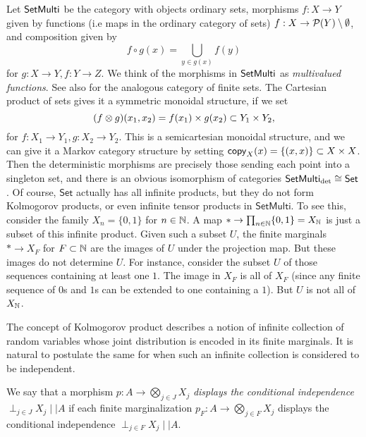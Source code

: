 \documentclass[11pt]{article}
\renewcommand{\sf}{\mathsf}
\begin{document}
\begin{example}
    \label{setmulti}
    Let $\operatorname{\mathsf{SetMulti}}$ be the category with objects ordinary sets, morphisms $f: X \to Y$ given by functions (i.e maps in the ordinary category of sets) $f: X \to \mathcal{P}(Y)\setminus \emptyset$, and composition given by
    \[f\circ g(x) = \bigcup_{y \in g(x)} f(y)\]
    for $g: X \to Y, f: Y \to Z$.
    We think of the morphisms in $\operatorname{\mathsf{SetMulti}}$ as \emph{multivalued functions}.
    See also \cite[Example~2.6]{markov_cats} for the analogous category of finite sets.
    The Cartesian product of sets gives it a symmetric monoidal structure, if we set \[(f \otimes g)(x_1,x_2) = f(x_1) \times g(x_2) \subset Y_1 \times Y_2,\] for $f:X_1 \to Y_1, g: X_2 \to Y_2$.
    This is a semicartesian monoidal structure, and we can give it a Markov category structure by setting
    $\mathsf{copy}_{X}(x) = \{(x,x)\} \subset X \times X$.
    Then the deterministic morphisms are precisely those sending each point into a singleton set, and there is an obvious isomorphism of categories
    $\SetMulti_\detc \cong \sf{Set}$.
    Of course, $\sf{Set}$ actually has all infinite products, but they do not form Kolmogorov products, or even infinite tensor products in $\sf{SetMulti}$.
    To see this, consider the family $X_n = \{0,1\}$ for $n \in \mathbb{N}$.
    A map $* \to \prod_{n\in \mathbb{N}} \{0,1\} = X_{\mathbb{N}}$ is just a subset of this infinite product.
    Given such a subset $U$, the finite marginals $* \to X_F$ for $F \subset \mathbb{N}$ are the images of $U$ under the projection map.
    But these images do not determine $U$. For instance, consider the subset $U$ of those sequences containing at least one $1$.
    The image in $X_F$ is all of $X_F$ (since any finite sequence of $0$s and $1$s can be extended to one containing a $1$).
    But $U$ is not all of $X_{\mathbb{N}}$.

\end{example}

The concept of Kolmogorov product describes a notion of infinite collection of random variables whose joint distribution is encoded in its finite marginals. It is natural to postulate the same for when such an infinite collection is considered to be independent.

\begin{definition}
	We say that a morphism $p : A \to \bigotimes_{j \in J} X_j$ \emph{displays the conditional independence} $\perp_{j \in J}  X_j \mid\mid A$ if each finite marginalization $p_F : A \to \bigotimes_{j \in F} X_j$ displays the conditional independence $\perp_{j \in F} X_j \mid\mid A$.
\end{definition}
\end{document}
